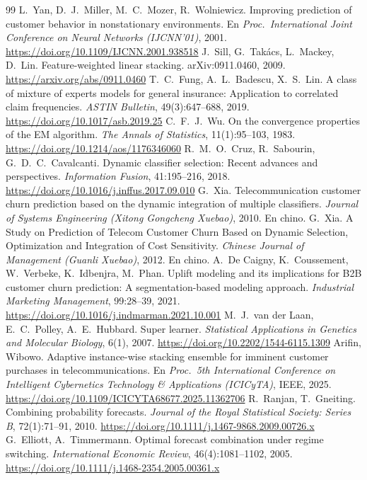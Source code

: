 \documentclass[11pt,a4paper]{article}
\newcommand{\doi}[1]{\url{https://doi.org/#1}}
\begin{document}
\begin{thebibliography}{99}
 L.~Yan, D.~J.~Miller, M.~C.~Mozer, R.~Wolniewicz. Improving prediction of customer behavior in nonstationary environments. En \emph{Proc.\ International Joint Conference on Neural Networks (IJCNN'01)}, 2001. \doi{10.1109/IJCNN.2001.938518}
 J.~Sill, G.~Takács, L.~Mackey, D.~Lin. Feature-weighted linear stacking. arXiv:0911.0460, 2009. \url{https://arxiv.org/abs/0911.0460}
 T.~C.~Fung, A.~L.~Badescu, X.~S.~Lin. A class of mixture of experts models for general insurance: Application to correlated claim frequencies. \emph{ASTIN Bulletin}, 49(3):647--688, 2019. \doi{10.1017/asb.2019.25}
 C.~F.~J.~Wu. On the convergence properties of the EM algorithm. \emph{The Annals of Statistics}, 11(1):95--103, 1983. \doi{10.1214/aos/1176346060}
 R.~M.~O.~Cruz, R.~Sabourin, G.~D.~C.~Cavalcanti. Dynamic classifier selection: Recent advances and perspectives. \emph{Information Fusion}, 41:195--216, 2018. \doi{10.1016/j.inffus.2017.09.010}
 G.~Xia. Telecommunication customer churn prediction based on the dynamic integration of multiple classifiers. \emph{Journal of Systems Engineering (Xitong Gongcheng Xuebao)}, 2010. En chino.
 G.~Xia. A Study on Prediction of Telecom Customer Churn Based on Dynamic Selection, Optimization and Integration of Cost Sensitivity. \emph{Chinese Journal of Management (Guanli Xuebao)}, 2012. En chino.
 A.~De Caigny, K.~Coussement, W.~Verbeke, K.~Idbenjra, M.~Phan. Uplift modeling and its implications for B2B customer churn prediction: A segmentation-based modeling approach. \emph{Industrial Marketing Management}, 99:28--39, 2021. \doi{10.1016/j.indmarman.2021.10.001}
 M.~J.~van der Laan, E.~C.~Polley, A.~E.~Hubbard. Super learner. \emph{Statistical Applications in Genetics and Molecular Biology}, 6(1), 2007. \doi{10.2202/1544-6115.1309}
 Arifin, Wibowo. Adaptive instance-wise stacking ensemble for imminent customer purchases in telecommunications. En \emph{Proc.\ 5th International Conference on Intelligent Cybernetics Technology \& Applications (ICICyTA)}, IEEE, 2025. \doi{10.1109/ICICYTA68677.2025.11362706}
 R.~Ranjan, T.~Gneiting. Combining probability forecasts. \emph{Journal of the Royal Statistical Society: Series B}, 72(1):71--91, 2010. \doi{10.1111/j.1467-9868.2009.00726.x}
 G.~Elliott, A.~Timmermann. Optimal forecast combination under regime switching. \emph{International Economic Review}, 46(4):1081--1102, 2005. \doi{10.1111/j.1468-2354.2005.00361.x}

\end{thebibliography}
\end{document}
